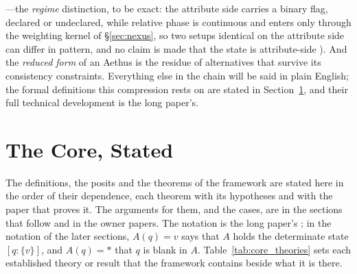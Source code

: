 \documentclass[11pt]{article}
\theoremstyle{definition}
\newcommand{\Aethus}{Aethus}
\begin{document}
---the \emph{regime} distinction, to be exact: the attribute side carries a binary flag, declared or undeclared, while relative phase is continuous and enters only through the weighting kernel of \S\ref{sec:nexus}, so two setups identical on the attribute side can differ in pattern, and no claim is made that the state is attribute-side%
). And the \emph{reduced form} of an \Aethus{} is the residue of alternatives that survive its consistency constraints. Everything else in the chain will be said in plain English; the formal definitions this compression rests on are stated in Section~\ref{sec:core}, and their full technical development is the long paper's.

\section{The Core, Stated}\label{sec:core}

The definitions, the posits and the theorems of the framework are stated here in the order of their dependence, each theorem with its hypotheses and with the paper that proves it. The arguments for them, and the cases, are in the sections that follow and in the owner papers. The notation is the long paper's \cite{Aethus}; in the notation of the later sections, $A(q) = v$ says that $A$ holds the determinate state $[q : \{v\}]$, and $A(q) = \ast$ that $q$ is blank in $A$. Table~\ref{tab:core_theories} sets each established theory or result that the framework contains beside what it is there.
\end{document}
